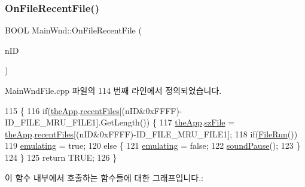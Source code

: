 \subsubsection{\texorpdfstring{On\+File\+Recent\+File()}{OnFileRecentFile()}}
{\footnotesize\ttfamily B\+O\+OL Main\+Wnd\+::\+On\+File\+Recent\+File (\begin{DoxyParamCaption}\item[{U\+I\+NT}]{n\+ID }\end{DoxyParamCaption})\hspace{0.3cm}{\ttfamily [protected]}}



Main\+Wnd\+File.\+cpp 파일의 114 번째 라인에서 정의되었습니다.


\begin{DoxyCode}
115 \{
116   \textcolor{keywordflow}{if}(\mbox{\hyperlink{_v_b_a_8cpp_a8095a9d06b37a7efe3723f3218ad8fb3}{theApp}}.\mbox{\hyperlink{class_v_b_a_ab5efdeee24caf6cec163a3f51b50bf64}{recentFiles}}[(nID&0xFFFF)-ID\_FILE\_MRU\_FILE1].GetLength()) \{
117     \mbox{\hyperlink{_v_b_a_8cpp_a8095a9d06b37a7efe3723f3218ad8fb3}{theApp}}.\mbox{\hyperlink{class_v_b_a_ac85720ef4e00c5455be15266b7119045}{szFile}} = \mbox{\hyperlink{_v_b_a_8cpp_a8095a9d06b37a7efe3723f3218ad8fb3}{theApp}}.\mbox{\hyperlink{class_v_b_a_ab5efdeee24caf6cec163a3f51b50bf64}{recentFiles}}[(nID&0xFFFF)-ID\_FILE\_MRU\_FILE1];
118     \textcolor{keywordflow}{if}(\mbox{\hyperlink{class_main_wnd_a946cd4793215a424eb736af418ccbc3d}{FileRun}}())
119       \mbox{\hyperlink{_main_wnd_file_8cpp_af9cc36078b1b311753963297ae7f2a74}{emulating}} = \textcolor{keyword}{true};
120     \textcolor{keywordflow}{else} \{
121       \mbox{\hyperlink{_main_wnd_file_8cpp_af9cc36078b1b311753963297ae7f2a74}{emulating}} = \textcolor{keyword}{false};
122       \mbox{\hyperlink{_sound_8cpp_a0716e7957671de324eeaa4ac1729d6b7}{soundPause}}();
123     \}
124   \}
125   \textcolor{keywordflow}{return} TRUE;
126 \}
\end{DoxyCode}
이 함수 내부에서 호출하는 함수들에 대한 그래프입니다.\+:
\nopagebreak
